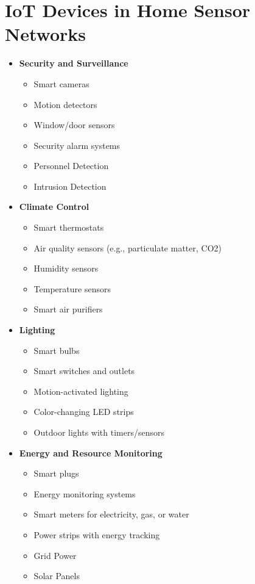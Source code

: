 \documentclass[journal]{IEEEtran} %
\begin{document}
\section*{IoT Devices in Home Sensor Networks}

\begin{itemize}[]  %
    \item{\textbf{Security and Surveillance}}
        \begin{itemize}
            \item Smart cameras
            \item Motion detectors
            \item Window/door sensors
            \item Security alarm systems
            \item Personnel Detection
            \item Intrusion Detection
        \end{itemize}

    \item{\textbf{Climate Control}}
        \begin{itemize}
            \item Smart thermostats
            \item Air quality sensors (e.g., particulate matter, CO2)
            \item Humidity sensors
            \item Temperature sensors
            \item Smart air purifiers
        \end{itemize}

    \item{\textbf{Lighting}}
        \begin{itemize}
            \item Smart bulbs
            \item Smart switches and outlets
            \item Motion-activated lighting
            \item Color-changing LED strips
            \item Outdoor lights with timers/sensors
        \end{itemize}

    \item{\textbf{Energy and Resource Monitoring}}
        \begin{itemize}
            \item Smart plugs
            \item Energy monitoring systems
            \item Smart meters for electricity, gas, or water
            \item Power strips with energy tracking
            \item Grid Power
            \item Solar Panels
        \end{itemize}


\end{itemize}
\end{document}
